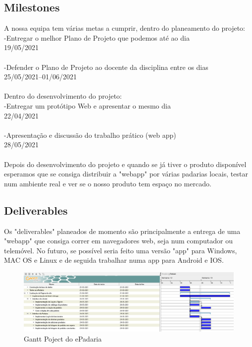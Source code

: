 \subsection{Milestones}
A nossa equipa tem várias metas a cumprir, dentro do planeamento do projeto:
\\-Entregar o melhor Plano de Projeto que podemos até ao dia \\19/05/2021\\
\\-Defender o Plano de Projeto ao docente da disciplina entre os dias\\ 25/05/2021--01/06/2021\\
\\Dentro do desenvolvimento do projeto:
\\-Entregar um protótipo Web e apresentar o mesmo dia \\22/04/2021\\
\\-Apresentação e discussão do trabalho prático (web app) \\28/05/2021
\\\\Depois do desenvolvimento do projeto e quando se já tiver o produto disponível esperamos que se consiga distribuir a "webapp" por várias padarias locais, testar num ambiente real e ver se o nosso produto tem espaço no mercado.

\subsection{Deliverables}
Os "deliverables" planeados de momento são principalmente a entrega de uma "webapp" que consiga correr em navegadores web, seja num computador ou telemóvel. No futuro, se possível seria feito uma versão "app" para Windows, MAC OS e Linux e de seguida trabalhar numa app para Android e IOS.\\

\begin{figure}[H]
	\centering
	\includegraphics[width=20cm,angle =90 ]{gantt}
	\caption{Gantt Poject do ePadaria}
	\label{fig:gantt}
\end{figure}